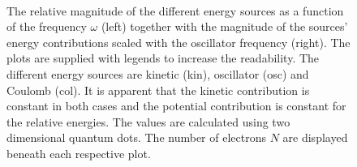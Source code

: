 \captionsetup[subfloat]{labelformat=empty}
\begin{figure}[h]
 \begin{center}
   \\
  \caption{The relative magnitude of the different energy sources as a function of the frequency $\omega$ (left) together with the magnitude of the sources' energy contributions scaled with the oscillator frequency (right). The plots are supplied with legends to increase the readability. The different energy sources are kinetic (kin), oscillator (osc) and Coulomb (col). It is apparent that the kinetic contribution is constant in both cases and the potential contribution is constant for the relative energies. The values are calculated using two dimensional quantum dots. The number of electrons $N$ are displayed beneath each respective plot.}
  \label{fig:E_dist_qdots}
 \end{center}
\end{figure}

